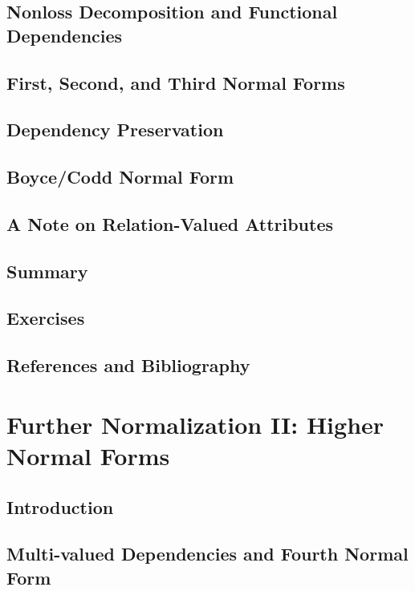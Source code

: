 \documentclass{book}
\begin{document}
\section{Nonloss Decomposition and Functional Dependencies}

\section{First, Second, and Third Normal Forms}

\section{Dependency Preservation}

\section{Boyce/Codd Normal Form}

\section{A Note on Relation-Valued Attributes}

\section{Summary}

\section{Exercises}

\section{References and Bibliography}



\chapter{Further Normalization II: Higher Normal Forms}

\section{Introduction}

\section{Multi-valued Dependencies and Fourth Normal Form}
\end{document}
